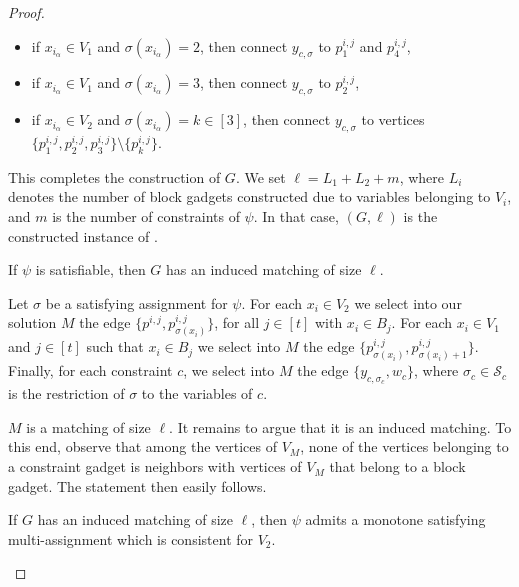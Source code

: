\begin{proof}
\begin{itemize}
        \item if $x_{i_\alpha} \in V_1$ and $\sigma(x_{i_\alpha}) = 2$,
        then connect $y_{c,\sigma}$ to $p^{i,j}_1$ and $p^{i,j}_4$,

        \item if $x_{i_\alpha} \in V_1$ and $\sigma(x_{i_\alpha}) = 3$,
        then connect $y_{c,\sigma}$ to $p^{i,j}_2$,

        \item if $x_{i_\alpha} \in V_2$ and $\sigma(x_{i_\alpha}) = k \in [3]$,
        then connect $y_{c,\sigma}$ to vertices $\{p^{i,j}_1,p^{i,j}_2,p^{i,j}_3\} \setminus \{p^{i,j}_k\}$.
    \end{itemize}

    This completes the construction of $G$.
    We set $\ell = L_1+L_2+m$, where $L_i$ denotes the number of block gadgets constructed
    due to variables belonging to $V_i$, and $m$ is the number of constraints of $\psi$.
    In that case, $(G,\ell)$ is the constructed instance of \InducedM.

    \begin{claim}
        If $\psi$ is satisfiable, then $G$ has an induced matching of size $\ell$.
    \end{claim}

    \begin{claimproof}
        Let $\sigma$ be a satisfying assignment for $\psi$.
        For each $x_i \in V_2$ we select into our solution $M$ the edge $\{p^{i,j}, p^{i,j}_{\sigma(x_i)}\}$,
        for all $j \in [t]$ with $x_i \in B_j$.
        For each $x_i \in V_1$ and $j \in [t]$ such that $x_i \in B_j$
        we select into $M$ the edge $\{p^{i,j}_{\sigma(x_i)}, p^{i,j}_{\sigma(x_i)+1}\}$.
        Finally, for each constraint $c$,
        we select into $M$ the edge $\{y_{c,\sigma_c}, w_c\}$,
        where $\sigma_c \in \mathcal{S}_c$ is the restriction of $\sigma$ to the variables of $c$.

        $M$ is a matching of size $\ell$.
        It remains to argue that it is an induced matching.
        To this end, observe that among the vertices of $V_M$,
        none of the vertices belonging to a constraint gadget
        is neighbors with vertices of $V_M$ that belong to a block gadget.
        The statement then easily follows.
    \end{claimproof}

    \begin{claim}
        If $G$ has an induced matching of size $\ell$,
        then $\psi$ admits a monotone satisfying multi-assignment which is consistent for $V_2$.
    \end{claim}


\end{proof}
